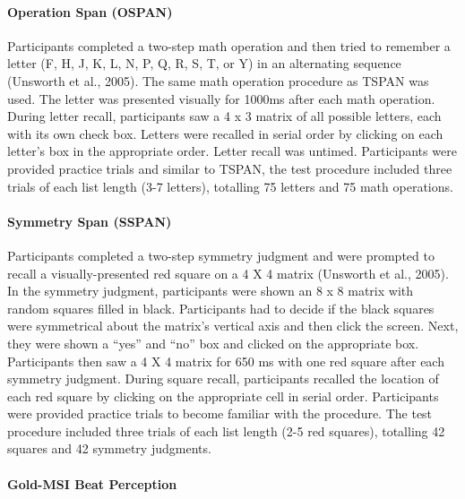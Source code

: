 \documentclass[]{book}
\let\oldparagraph\paragraph
\renewcommand{\paragraph}[1]{\oldparagraph{#1}\mbox{}}
\theoremstyle{definition}
\theoremstyle{definition}
\theoremstyle{definition}
\theoremstyle{remark}
\begin{document}
\hypertarget{operation-span-ospan}{%
\paragraph{Operation Span (OSPAN)}\label{operation-span-ospan}}

Participants completed a two-step math operation and then tried to
remember a letter (F, H, J, K, L, N, P, Q, R, S, T, or Y) in an
alternating sequence (Unsworth et al., 2005). The same math operation
procedure as TSPAN was used. The letter was presented visually for
1000ms after each math operation. During letter recall, participants saw
a 4 x 3 matrix of all possible letters, each with its own check box.
Letters were recalled in serial order by clicking on each letter's box
in the appropriate order. Letter recall was untimed. Participants were
provided practice trials and similar to TSPAN, the test procedure
included three trials of each list length (3-7 letters), totalling 75
letters and 75 math operations.

\hypertarget{symmetry-span-sspan}{%
\paragraph{Symmetry Span (SSPAN)}\label{symmetry-span-sspan}}

Participants completed a two-step symmetry judgment and were prompted to
recall a visually-presented red square on a 4 X 4 matrix (Unsworth et
al., 2005). In the symmetry judgment, participants were shown an 8 x 8
matrix with random squares filled in black. Participants had to decide
if the black squares were symmetrical about the matrix's vertical axis
and then click the screen. Next, they were shown a ``yes'' and ``no''
box and clicked on the appropriate box. Participants then saw a 4 X 4
matrix for 650 ms with one red square after each symmetry judgment.
During square recall, participants recalled the location of each red
square by clicking on the appropriate cell in serial order. Participants
were provided practice trials to become familiar with the procedure. The
test procedure included three trials of each list length (2-5 red
squares), totalling 42 squares and 42 symmetry judgments.

\hypertarget{gold-msi-beat-perception}{%
\paragraph{Gold-MSI Beat Perception}\label{gold-msi-beat-perception}}
\end{document}
